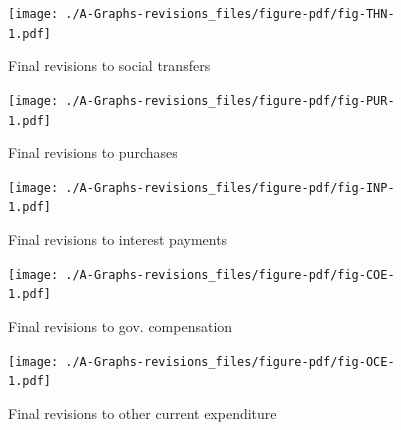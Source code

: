 \documentclass[
  letterpaper,
  authoryear,
  preprint,
  3p]{elsarticle}
\begin{document}
\pagebreak

\begin{figure}[H]

{\centering \texttt{[image: ./A-Graphs-revisions\_files/figure-pdf/fig-THN-1.pdf]}

}

\caption{\label{fig-THN}Final revisions to social transfers}

\end{figure}

\pagebreak

\begin{figure}[H]

{\centering \texttt{[image: ./A-Graphs-revisions\_files/figure-pdf/fig-PUR-1.pdf]}

}

\caption{\label{fig-PUR}Final revisions to purchases}

\end{figure}

\pagebreak

\begin{figure}[H]

{\centering \texttt{[image: ./A-Graphs-revisions\_files/figure-pdf/fig-INP-1.pdf]}

}

\caption{\label{fig-INP}Final revisions to interest payments}

\end{figure}

\pagebreak

\begin{figure}[H]

{\centering \texttt{[image: ./A-Graphs-revisions\_files/figure-pdf/fig-COE-1.pdf]}

}

\caption{\label{fig-COE}Final revisions to gov. compensation}

\end{figure}

\pagebreak

\begin{figure}[H]

{\centering \texttt{[image: ./A-Graphs-revisions\_files/figure-pdf/fig-OCE-1.pdf]}

}

\caption{\label{fig-OCE}Final revisions to other current expenditure}

\end{figure}

\pagebreak
\end{document}
